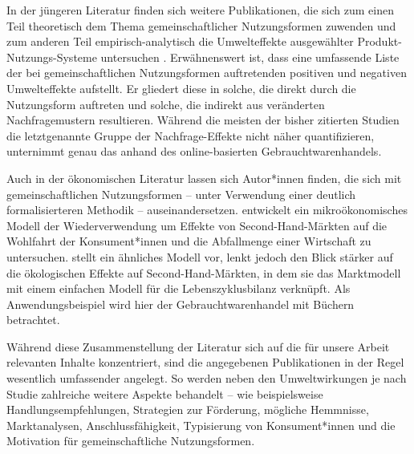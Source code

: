 \documentclass[11pt, titlepage=true]{scrartcl} %
\begin{document}
In der jüngeren Literatur finden sich weitere Publikationen,
die sich zum einen Teil theoretisch dem Thema gemeinschaftlicher
Nutzungsformen zuwenden
\parencites{scholl_marketing_2009}{scholl_nutzen_2012} und zum
anderen Teil empirisch-analytisch die Umwelteffekte ausgewählter
Produkt-Nutzungs-Systeme untersuchen
\parencites{rabelt_nachhaltiger_2007}{erdmann_quantifizierung_2011}.
Erwähnenswert ist, dass \textcite{scholl_marketing_2009} eine
umfassende Liste der bei gemeinschaftlichen Nutzungsformen 
auftretenden positiven und negativen Umwelteffekte aufstellt. Er
gliedert diese in solche, die direkt durch die
Nutzungsform auftreten und solche, die indirekt aus veränderten
Nachfragemustern resultieren.
Während die meisten der bisher zitierten Studien die letztgenannte Gruppe der Nachfrage-Effekte
nicht näher quantifizieren, unternimmt
\textcite{erdmann_quantifizierung_2011}  genau das anhand des
online-basierten Gebrauchtwarenhandels.

Auch in der ökonomischen Literatur lassen sich Autor*innen finden, die sich mit gemeinschaftlichen Nutzungsformen -- unter Verwendung einer deutlich formalisierteren Methodik --
auseinandersetzen. \textcite{yokoo_economic_2010} entwickelt ein
mikroökonomisches Modell der Wiederverwendung um Effekte von Second-Hand-Märkten auf die Wohlfahrt der Konsument*innen und die Abfallmenge einer Wirtschaft zu untersuchen.
\textcite{thomas_environmental_2011} stellt ein ähnliches
Modell vor, lenkt jedoch den Blick stärker auf die ökologischen Effekte auf Second-Hand-Märkten, in dem sie das Marktmodell mit einem einfachen Modell für die Lebenszyklusbilanz verknüpft. Als Anwendungsbeispiel wird hier der Gebrauchtwarenhandel mit Büchern betrachtet.

Während diese Zusammenstellung der Literatur sich auf die für unsere Arbeit relevanten Inhalte konzentriert, sind die angegebenen Publikationen in der Regel wesentlich umfassender angelegt. So werden neben den Umweltwirkungen je nach Studie zahlreiche weitere Aspekte behandelt -- wie beispielsweise Handlungsempfehlungen, Strategien zur Förderung, mögliche Hemmnisse, Marktanalysen, Anschlussfähigkeit, Typisierung von Konsument*innen und die
Motivation für gemeinschaftliche Nutzungsformen.
\end{document}
